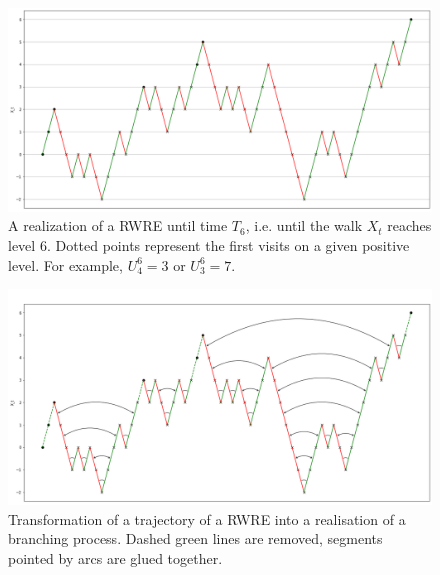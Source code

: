 \documentclass[12pt]{article}
\begin{document}
\begin{figure}[H]
    \centering
    \includegraphics[width=\textwidth,height=\textheight,keepaspectratio]{walk.png}
    \caption{A realization of a RWRE until time $T_6$, i.e. until the walk $X_t$ reaches level 6. Dotted points represent the first visits on a given positive level. For example, $U_4^6 = 3$ or $U_3^6 = 7$.}
    \label{fig:walk}
\end{figure}

\begin{figure}[H]
    \centering
    \includegraphics[width=\textwidth,height=\textheight,keepaspectratio]{walk_merging.png}
    \caption{Transformation of a trajectory of a RWRE into a realisation of a branching process. Dashed green lines are removed, segments pointed by arcs are glued together.}
    \label{fig:walk_merging}
\end{figure}
\end{document}
